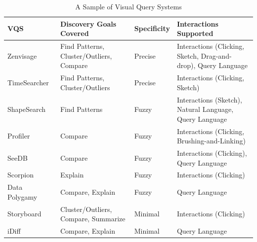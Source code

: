 \begin{table}[!t]
\scriptsize
\centering
\begin{tabular}{l|l|l|p{7.5cm}}
VQS & Discovery Goals Covered & Specificity & Interactions Supported \\ \hline

Zenvisage~\cite{Lee2017,Siddiqui2016} & Find Patterns, Cluster/Outliers, Compare & Precise & Interactions (Clicking, Sketch, Drag-and-drop), Query Language \\
TimeSearcher~\cite{hochheiser2004dynamic} & Find Patterns, Cluster/Outliers & Precise & Interactions (Clicking, Sketch) \\
ShapeSearch~\cite{Siddiqui2018} & Find Patterns & Fuzzy & Interactions (Sketch), Natural Language, Query Language \\
Profiler~\cite{Kandel2012} & Compare & Fuzzy & Interactions (Clicking, Brushing-and-Linking) \\
SeeDB~\cite{Vartak2015} & Compare & Fuzzy & Interactions (Clicking), Query Language \\
Scorpion~\cite{Wu2013} & Explain & Fuzzy & Interactions (Clicking) \\
Data Polygamy~\cite{chirigati2016data} & Compare, Explain & Fuzzy & Query Language \\
Storyboard~\cite{Lee2018} & Cluster/Outliers, Compare, Summarize & Minimal & Interactions (Clicking) \\
iDiff~\cite{Sarawagi1998,Sarawagi2000} & Compare, Explain & Minimal & Query Language \\

\end{tabular}
\vspace{-10pt}
\caption{A Sample of Visual Query Systems}\label{fig:table}
\vspace{-10pt}
\end{table}



